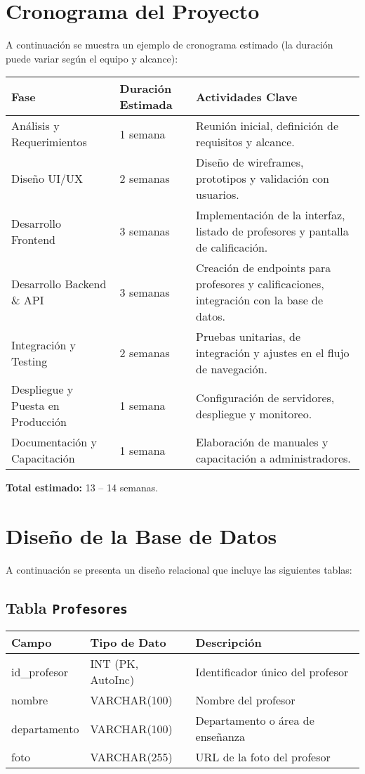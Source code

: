 \documentclass[11pt]{article}
\begin{document}
\section{Cronograma del Proyecto}

A continuación se muestra un ejemplo de cronograma estimado (la duración puede variar según el equipo y alcance):

\begin{center}
\begin{tabularx}{\textwidth}{@{}lp{3cm}X@{}}
\toprule
\textbf{Fase} & \textbf{Duración Estimada} & \textbf{Actividades Clave} \\ \midrule
Análisis y Requerimientos & 1 semana & Reunión inicial, definición de requisitos y alcance. \\
Diseño UI/UX & 2 semanas & Diseño de wireframes, prototipos y validación con usuarios. \\
Desarrollo Frontend & 3 semanas & Implementación de la interfaz, listado de profesores y pantalla de calificación. \\
Desarrollo Backend \& API & 3 semanas & Creación de endpoints para profesores y calificaciones, integración con la base de datos. \\
Integración y Testing & 2 semanas & Pruebas unitarias, de integración y ajustes en el flujo de navegación. \\
Despliegue y Puesta en Producción & 1 semana & Configuración de servidores, despliegue y monitoreo. \\
Documentación y Capacitación & 1 semana & Elaboración de manuales y capacitación a administradores. \\ \bottomrule
\end{tabularx}
\end{center}

\noindent \textbf{Total estimado:} 13 -- 14 semanas.

\section{Diseño de la Base de Datos}

A continuación se presenta un diseño relacional que incluye las siguientes tablas:

\subsection{Tabla \texttt{Profesores}}
\begin{center}
\begin{tabularx}{\textwidth}{@{}p{4cm}p{3cm}X@{}}
\toprule
\textbf{Campo} & \textbf{Tipo de Dato} & \textbf{Descripción} \\ \midrule
id\_profesor   & INT (PK, AutoInc)  & Identificador único del profesor \\
nombre         & VARCHAR(100)       & Nombre del profesor \\
departamento   & VARCHAR(100)       & Departamento o área de enseñanza \\
foto           & VARCHAR(255)       & URL de la foto del profesor \\ \bottomrule
\end{tabularx}
\end{center}
\end{document}
